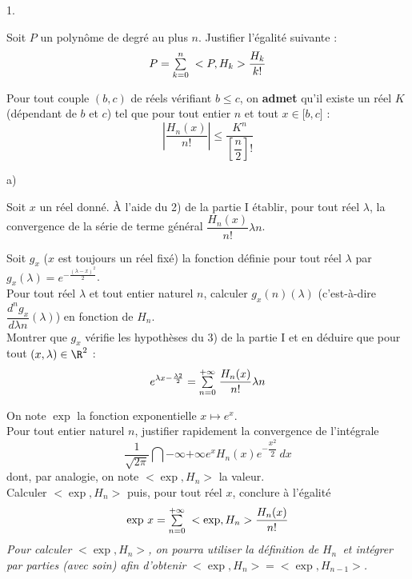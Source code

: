 \documentclass[11pt]{article}%
\begin{document}
\begin{noliste}{1.}
 \setlength{\itemsep}{4mm}
\item Soit $P$ un polynôme de degré au plus $n$. Justifier l'égalité
suivante : 
\[
P = {\textstyle\sum\limits_{k = 0}^{n}}\hspace{.1cm}<P,H_{k}>{\dfrac{H_{k}}{k!}}
\]

\item Pour tout couple $(b,c)$ de réels vérifiant $b\leq c$, on
\textbf{admet} qu'il existe un réel $K$ (dépendant de $b$ et $c$) tel
que pour tout
entier $n$ et tout $x\in \lbrack b,c]$ : 
\[
\left| \dfrac{H_{n}(x)}{n!}\right| \leq {\dfrac{K^{n}}{\left[ 
\dfrac{n}{2}\right] !}}
\]

\begin{noliste}{a)}
 \setlength{\itemsep}{2mm}
\item Soit $x$ un réel donné. À l'aide du 2) de la partie I établir,
pour
tout réel $\lambda {}$, la convergence de la série de terme général
$\dfrac{H_{n}(x)}{n!}\lambda {}{n}$.

\item Soit $g_{x}$ ($x$ est toujours un réel fixé) la fonction définie
pour
tout réel $\lambda {}$ par $g_{x}(\lambda {}) = e^{-\frac{(\lambda
{}-x)^{2}}{2}}$.\\
Pour tout réel $\lambda {}$ et tout entier naturel $n$, calculer
$g_{x}{(n)}(\lambda {})$ (c'est-à-dire ${\dfrac{d^{n}g_{x}}{d\lambda
{}{n}}}(\lambda {})$) en fonction de $H_{n}$.\\
Montrer que $g_{x}$ vérifie les hypothèses du 3) de la partie I et en
déduire que pour tout $(x,\lambda {})\in \R^{2}$ : 
\[
e^{\lambda x-\frac{\lambda {}{2}}{2}} = {\textstyle\sum\limits_{n = 0}^{+ \infty
}}\hspace{.1cm}\dfrac{H_{n}(x)}{n!}\lambda {}{n}
\]

\item On note $\exp $ la fonction exponentielle $x\mapsto e^{x}$.\\
Pour tout entier naturel $n$, justifier rapidement la convergence de
l'intégrale 
\[
{\dfrac{1}{\sqrt{2\pi }}}\dint{-\infty }{+ \infty
}e^{x}H_{n}(x)e^{-\dfrac{x^{2}}{2}}\,dx
\]
dont, par analogie, on note $<\exp,H_{n}>$ la valeur.\\
Calculer $<\exp,H_{n}>$ puis, pour tout réel $x$, conclure à l'égalité 
\[
\exp \,x = {\textstyle\sum\limits_{n = 0}^{+ \infty }}\hspace{.1cm}<\exp,H_{n}>\dfrac{H_{n}(x)}{n!}
\]
\textit{Pour calculer }$<\exp,H_{n}>$\textit{, on pourra utiliser la
définition de }$H_{n}$\textit{\ et intégrer par parties (avec soin)
afin
d'obtenir }$<\exp,H_{n}> = <\exp,H_{n-1}>$\textit{. }
\end{noliste}
\end{noliste}

\label{fin}
\end{document}
